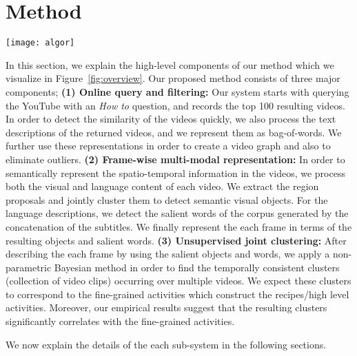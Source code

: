 \section{Method}
\label{sec:overview}
\begin{figure*}[t]
  \texttt{[image: algor]}
  \caption{Components of our recipe understanding method. \textbf{Query:} We query the YouTube for top 100 \emph{How To} videos and filter the outliers; \textbf{Framewise Representation:} We automatically extract object clusters and salient word in order to find multi-modal representation of each frame. \textbf{Unsupervised Activity Detection:} We jointly cluster videos in order to learn activities/steps related to the recipe.}
\label{fig:overview}
\end{figure*}

In this section, we explain the high-level components of our method which we visualize in Figure~\ref{fig:overview}. Our proposed method consists of three major components; \textbf{(1) Online query and filtering:} Our system starts with querying the YouTube with an \emph{How to} question, and records the top 100 resulting videos. In order to detect the similarity of the videos quickly, we also process the text descriptions of the returned videos, and we represent them as bag-of-words. We further use these representations in order to create a video graph and also to eliminate outliers. \textbf{(2) Frame-wise multi-modal representation:} In order to semantically represent the spatio-temporal information in the videos, we process both the visual and language content of each video. We extract the region proposals and jointly cluster them to detect semantic visual objects. For the language descriptions, we detect the salient words of the corpus generated by the concatenation of the subtitles. We finally represent the each frame in terms of the resulting objects and salient words. \textbf{(3) Unsupervised joint clustering:} After describing the each frame by using the salient objects and words, we apply a non-parametric Bayesian method in order to find the temporally consistent clusters (collection of video clips) occurring over multiple videos. We expect these clusters to correspond to the fine-grained activities which construct the recipes/high level activities. Moreover, our empirical results suggest that the resulting clusters significantly correlates with the fine-grained activities.

We now explain the details of the each sub-system in the following sections.
